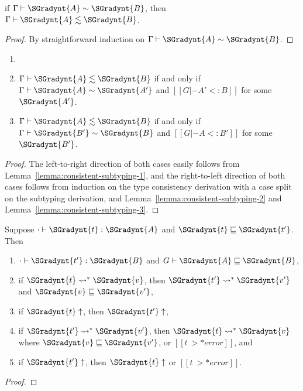 \begin{lemma}
  \label{lemma:consistent-subtyping-3}
  if $ \Gamma  \vdash  \SGradynt{A}  \sim  \SGradynt{B} $, then $ \Gamma  \vdash  \SGradynt{A}  \lesssim  \SGradynt{B} $.
\end{lemma}
\begin{proof}
  By straightforward induction on $ \Gamma  \vdash  \SGradynt{A}  \sim  \SGradynt{B} $.
\end{proof}

\begin{corollary}
  \label{corollary:consistent_subtyping}
  \begin{enumerate}[label=\roman*.,align=left]
  \item[]
  \item $ \Gamma  \vdash  \SGradynt{A}  \lesssim  \SGradynt{B} $ if and only if $ \Gamma  \vdash  \SGradynt{A}  \sim  \SGradynt{A'} $ and $[[G |- A' <: B]]$ for some $\SGradynt{A'}$.
  \item $ \Gamma  \vdash  \SGradynt{A}  \lesssim  \SGradynt{B} $ if and only if $ \Gamma  \vdash  \SGradynt{B'}  \sim  \SGradynt{B} $ and $[[G |- A <: B']]$ for some $\SGradynt{B'}$.
  \end{enumerate}
\end{corollary}
\begin{proof}
  The left-to-right direction of both cases easily follows from
  Lemma~\ref{lemma:consistent-subtyping-1}, and the right-to-left
  direction of both cases follows from induction on the type
  consistency derivation with a case split on the subtyping derivation,
  and Lemma~\ref{lemma:consistent-subtyping-2} and Lemma~\ref{lemma:consistent-subtyping-3}.
\end{proof}

\begin{theorem}
  \label{thm:gradual_guarantee}
  Suppose $  \cdot   \vdash  \SGradynt{t}  :  \SGradynt{A} $ and $ \SGradynt{t}  \sqsubseteq  \SGradynt{t'} $.  Then
  \begin{enumerate}[label=\roman*., align=left]     
  \item $  \cdot   \vdash  \SGradynt{t'}  :  \SGradynt{B} $ and $ G \vdash  \SGradynt{A}  \sqsubseteq  \SGradynt{B} $,
  \item if $ \SGradynt{t}  \rightsquigarrow^*  \SGradynt{v} $, then $ \SGradynt{t'}  \rightsquigarrow^*  \SGradynt{v'} $ and $ \SGradynt{v}  \sqsubseteq  \SGradynt{v'} $,
  \item if $ \SGradynt{t}  \uparrow $, then $ \SGradynt{t'}  \uparrow $,
  \item if $ \SGradynt{t'}  \rightsquigarrow^*  \SGradynt{v'} $, then $ \SGradynt{t}  \rightsquigarrow^*  \SGradynt{v} $ where $ \SGradynt{v}  \sqsubseteq  \SGradynt{v'} $, or $[[t ~>* error]]$, and
  \item if $ \SGradynt{t'}  \uparrow $, then $ \SGradynt{t}  \uparrow $ or $[[t ~>* error]]$.
  \end{enumerate}
\end{theorem}
\begin{proof}
  
\end{proof}
